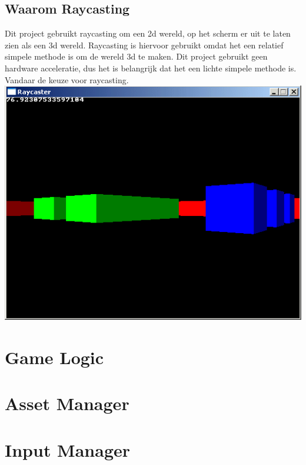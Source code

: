 \documentclass{report}
\begin{document}
  \subsection{Waarom Raycasting} %
  \label{sub:waarom_raycasting}
  Dit project gebruikt raycasting om een 2d wereld, op het scherm er uit te laten zien als een 3d wereld. Raycasting is hiervoor gebruikt omdat het een relatief simpele methode is om de wereld 3d te maken. Dit project gebruikt geen hardware acceleratie, dus het is belangrijk dat het een lichte simpele methode is. Vandaar de keuze voor raycasting.
  \includegraphics{technisch verslag imgs/raycasteruntextured.png}

  \section{Game Logic} %
  \label{sec:game_logic}


  \section{Asset Manager} %
  \label{sec:asset_manager}


  \section{Input Manager} %
  \label{sec:input_manager}
\end{document}
